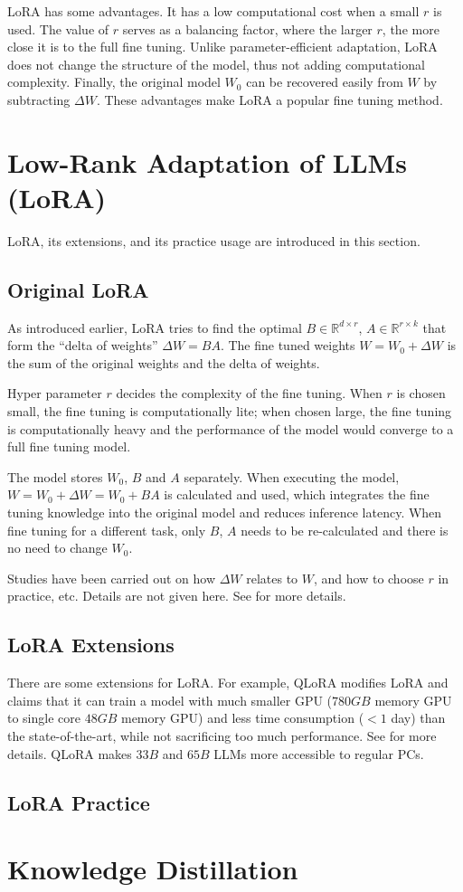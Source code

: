 LoRA has some advantages. It has a low computational cost when a small $r$ is used. The value of $r$ serves as a balancing factor, where the larger $r$, the more close it is to the full fine tuning. Unlike parameter-efficient adaptation, LoRA does not change the structure of the model, thus not adding computational complexity. Finally, the original model $W_0$ can be recovered easily from $W$ by subtracting $\Delta W$. These advantages make LoRA a popular fine tuning method.

\section{Low-Rank Adaptation of LLMs (LoRA)}

LoRA, its extensions, and its practice usage are introduced in this section.

\subsection{Original LoRA}

As introduced earlier, LoRA tries to find the optimal $B\in\mathbb{R}^{d\times r}$, $A\in\mathbb{R}^{r\times k}$ that form the ``delta of weights'' $\Delta W = BA$. The fine tuned weights $W = W_0+\Delta W$ is the sum of the original weights and the delta of weights.

Hyper parameter $r$ decides the complexity of the fine tuning. When $r$ is chosen small, the fine tuning is computationally lite; when chosen large, the fine tuning is computationally heavy and the performance of the model would converge to a full fine tuning model.

The model stores $W_0$, $B$ and $A$ separately. When executing the model, $W = W_0+\Delta W = W_0 + BA$ is calculated and used, which integrates the fine tuning knowledge into the original model and reduces inference latency. When fine tuning for a different task, only $B$, $A$ needs to be re-calculated and there is no need to change $W_0$.

Studies have been carried out on how $\Delta W$ relates to $W$, and how to choose $r$ in practice, etc. Details are not given here. See \cite{hu2021lora} for more details.

\subsection{LoRA Extensions}

There are some extensions for LoRA. For example, QLoRA modifies LoRA and claims that it can train a model with much smaller GPU ($780GB$ memory GPU to single core $48GB$ memory GPU) and less time consumption ($<1$ day) than the state-of-the-art, while not sacrificing too much performance. See \cite{dettmers2023qlora} for more details. QLoRA makes $33B$ and $65B$ LLMs more accessible to regular PCs.

\subsection{LoRA Practice}

\section{Knowledge Distillation}

